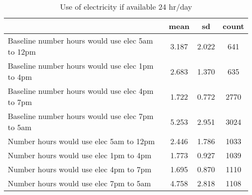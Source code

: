 \begin{table}[htbp]\centering
\def\sym#1{\ifmmode^{#1}\else\(^{#1}\)\fi}
\caption{Use of electricity if available 24 hr/day}
\begin{tabular*}{0.9\hsize}{@{\hskip\tabcolsep\extracolsep\fill}l*{1}{ccc}}
\toprule
                                &     mean&       sd&    count\\
\midrule
Baseline number hours would use elec 5am to 12pm&    3.187&    2.022&      641\\
Baseline number hours would use elec 1pm to 4pm&    2.683&    1.370&      635\\
Baseline number hours would use elec 4pm to 7pm&    1.722&    0.772&     2770\\
Baseline number hours would use elec 7pm to 5am&    5.253&    2.951&     3024\\
Number hours would use elec 5am to 12pm&    2.446&    1.786&     1033\\
Number hours would use elec 1pm to 4pm&    1.773&    0.927&     1039\\
Number hours would use elec 4pm to 7pm&    1.695&    0.870&     1110\\
Number hours would use elec 7pm to 5am&    4.758&    2.818&     1108\\
\bottomrule
\end{tabular*}
\end{table}
